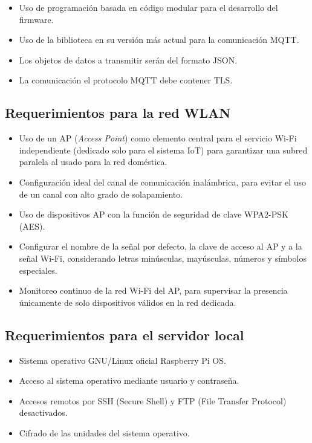 \begin{itemize}
\item Uso de programación basada en código modular para el desarrollo del firmware.
\item Uso de la biblioteca en su versión más actual para la comunicación MQTT.
\item Los objetos de datos a transmitir serán del formato JSON.
\item La comunicación el protocolo MQTT debe contener TLS.
\end{itemize}

\subsection{Requerimientos para la red WLAN}

\begin{itemize}
\item Uso de un AP (\emph{Access Point}) como elemento central para el servicio Wi-Fi independiente (dedicado solo para el sistema IoT) para garantizar una subred paralela al usado para la red doméstica.
\item Configuración ideal del canal de comunicación inalámbrica, para evitar el uso de un canal con alto grado de solapamiento.
\item Uso de dispositivos AP con la función de seguridad de clave WPA2-PSK (AES).
\item Configurar el nombre de la señal por defecto, la clave de acceso al AP y a la señal Wi-Fi, considerando letras minúsculas, mayúsculas, números y símbolos especiales.
\item Monitoreo continuo de la red Wi-Fi del AP, para supervisar la presencia únicamente de solo dispositivos válidos en la red dedicada.
\end{itemize}


\subsection{Requerimientos para el servidor local}

\begin{itemize}
\item Sistema operativo GNU/Linux oficial Raspberry Pi OS.
\item Acceso al sistema operativo mediante usuario y contraseña.
\item Accesos remotos por SSH (Secure Shell) y FTP (File Transfer Protocol)  desactivados.
\item Cifrado de las unidades del sistema operativo.
\end{itemize}

